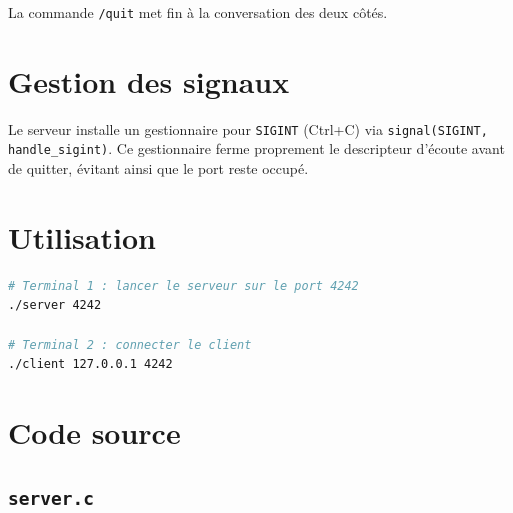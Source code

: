\documentclass[12pt,a4paper]{article}
\begin{document}
La commande \texttt{/quit} met fin à la conversation des deux côtés.

\section{Gestion des signaux}

Le serveur installe un gestionnaire pour \texttt{SIGINT} (Ctrl+C) via
\texttt{signal(SIGINT, handle\_sigint)}. Ce gestionnaire ferme proprement
le descripteur d'écoute avant de quitter, évitant ainsi que le port reste
occupé.

\section{Utilisation}

\begin{lstlisting}[language=bash, style=cstyle]
# Terminal 1 : lancer le serveur sur le port 4242
./server 4242

# Terminal 2 : connecter le client
./client 127.0.0.1 4242
\end{lstlisting}

\section{Code source}

\subsection{\texttt{server.c}}
\end{document}
